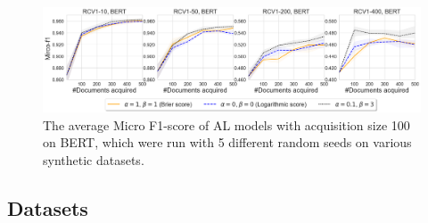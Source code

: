 \documentclass[letterpaper]{article} %
\begin{document}
\begin{figure}[!t]
\centering
\includegraphics[width=1\textwidth]{figures/syn_rcv1meanIR50_mircof1.png}
    \caption{The average Micro F1-score of AL models with acquisition size 100 on BERT, which were run with 5 different random seeds on various synthetic datasets.}
\label{fig:syn_rcv1meanIR50_mircof1}
\vspace{-3mm}
\end{figure}

\subsection{Datasets}
\end{document}
